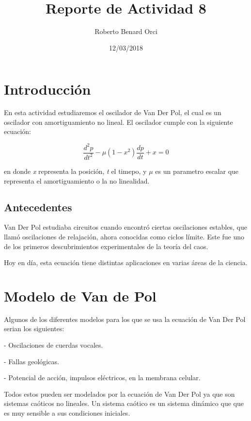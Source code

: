 \documentclass{article}
\title{Reporte de Actividad 8}
\author{Roberto Benard Orci}
\date{12/03/2018}
\begin{document}
\maketitle

\section{Introducción}

En esta actividad estudiaremos el oscilador de Van Der Pol, el cual es un oscilador con amortiguamiento no lineal. El oscilador cumple con la siguiente ecuación:

 \begin{equation}
 \frac{d^2p}{dt^2} -\mu (1-x^2)\frac{dp}{dt} + x = 0
 \end{equation}
 
en donde \textit{x} representa la posición, \textit{t} el timepo, y $\mu$ es un parametro escalar que representa el amortiguamiento o la no linealidad. 

\subsection{Antecedentes}

Van Der Pol estudiaba circuitos cuando encontró ciertas oscilaciones estables, que llamó oscilaciones de relajación, ahora conocidas como ciclos límite. Este fue uno de los primeros descubrimientos experimentales de la teoría del caos.

Hoy en día, esta ecuación tiene distintas aplicaciones en varias áreas de la ciencia.


\section{Modelo de Van de Pol}

Algunos de los diferentes modelos para los que se usa la ecuación de Van Der Pol serian los siguientes: 

\vspace{0.3cm}

\noindent - Oscilaciones de cuerdas vocales.

\noindent - Fallas geológicas.

\noindent - Potencial de acción, impulsos eléctricos, en la membrana celular.

\vspace{0.3cm}

Todos estos pueden ser modelados por la ecuación de Van Der Pol ya que son sistemas caóticos no lineales. Un sistema caótico es un sistema dinámico que que es muy sensible a sus condiciones iniciales. 
\end{document}
